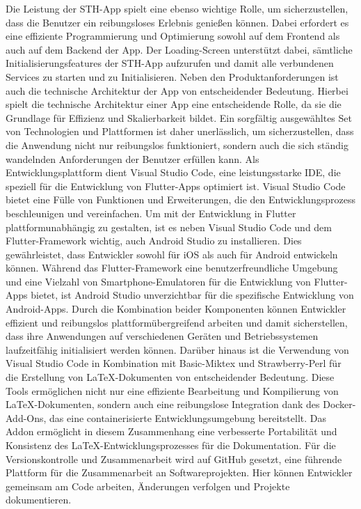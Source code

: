 Die Leistung der STH-App spielt eine ebenso wichtige Rolle, um sicherzustellen, dass die Benutzer ein reibungsloses Erlebnis genießen können. Dabei erfordert es eine effiziente Programmierung und Optimierung sowohl auf dem Frontend als auch auf dem Backend der App. Der Loading-Screen unterstützt dabei, sämtliche Initialisierungsfeatures der STH-App aufzurufen und damit alle verbundenen Services zu starten und zu Initialisieren.
Neben den Produktanforderungen ist auch die technische Architektur der App von entscheidender Bedeutung. Hierbei spielt die technische Architektur einer App eine entscheidende Rolle, da sie die Grundlage für Effizienz und Skalierbarkeit bildet.
Ein sorgfältig ausgewähltes Set von Technologien und Plattformen ist daher unerlässlich, um sicherzustellen, dass die Anwendung nicht nur reibungslos funktioniert, sondern auch die sich ständig wandelnden Anforderungen der Benutzer erfüllen kann.
Als Entwicklungsplattform dient Visual Studio Code, eine leistungsstarke IDE, die speziell für die Entwicklung von Flutter-Apps optimiert ist. Visual Studio Code bietet eine Fülle von Funktionen und Erweiterungen, die den Entwicklungsprozess beschleunigen und vereinfachen.
Um mit der Entwicklung in Flutter plattformunabhängig zu gestalten, ist es neben Visual Studio Code und dem Flutter-Framework wichtig, auch Android Studio zu installieren. Dies gewährleistet, dass Entwickler sowohl für iOS als auch für Android entwickeln können. Während das Flutter-Framework eine benutzerfreundliche Umgebung und eine Vielzahl von Smartphone-Emulatoren für die Entwicklung von Flutter-Apps bietet, ist Android Studio unverzichtbar für die spezifische Entwicklung von Android-Apps. Durch die Kombination beider Komponenten können Entwickler effizient und reibungslos plattformübergreifend arbeiten und damit sicherstellen, dass ihre Anwendungen auf verschiedenen Geräten und Betriebssystemen laufzeitfähig initialisiert werden können.
Darüber hinaus ist die Verwendung von Visual Studio Code in Kombination mit Basic-Miktex und Strawberry-Perl für die Erstellung von LaTeX-Dokumenten von entscheidender Bedeutung. Diese Tools ermöglichen nicht nur eine effiziente Bearbeitung und Kompilierung von LaTeX-Dokumenten, sondern auch eine reibungslose Integration dank des Docker-Add-Ons, das eine containerisierte Entwicklungsumgebung bereitstellt. Das Addon ermöglicht in diesem Zusammenhang eine verbesserte Portabilität und Konsistenz des LaTeX-Entwicklungsprozesses für die Dokumentation.
Für die Versionskontrolle und Zusammenarbeit wird auf GitHub gesetzt, eine führende Plattform für die Zusammenarbeit an Softwareprojekten. Hier können Entwickler gemeinsam am Code arbeiten, Änderungen verfolgen und Projekte dokumentieren.

